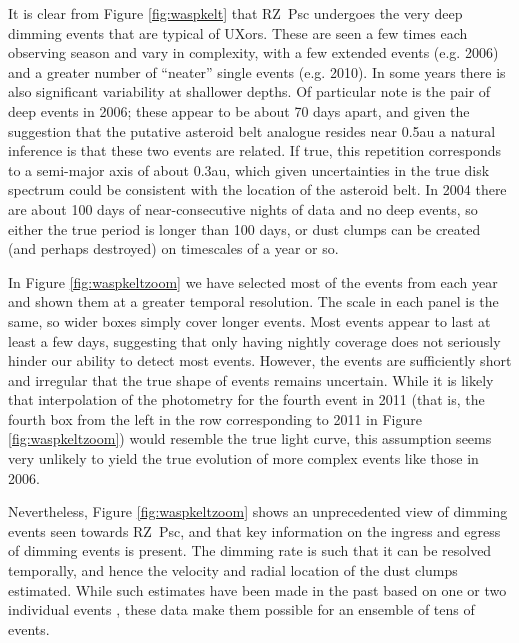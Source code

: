 \documentclass[]{rsos}
\begin{document}
It is clear from Figure \ref{fig:waspkelt} that RZ~Psc undergoes the very deep dimming
events that are typical of UXors. These are seen a few times each observing season and
vary in complexity, with a few extended events (e.g. 2006) and a greater number of
``neater'' single events (e.g. 2010). In some years there is also significant variability
at shallower depths. Of particular note is the pair of deep events in 2006; these appear
to be about 70 days apart, and given the suggestion that the putative asteroid belt
analogue resides near 0.5au a natural inference is that these two events are related. If
true, this repetition corresponds to a semi-major axis of about 0.3au, which given
uncertainties in the true disk spectrum could be consistent with the location of the
asteroid belt. In 2004 there are about 100 days of near-consecutive nights of data and no
deep events, so either the true period is longer than 100 days, or dust clumps can be
created (and perhaps destroyed) on timescales of a year or so.

In Figure \ref{fig:waspkeltzoom} we have selected most of the events from each year and
shown them at a greater temporal resolution. The scale in each panel is the same, so
wider boxes simply cover longer events. Most events appear to last at least a few days,
suggesting that only having nightly coverage does not seriously hinder our ability to
detect most events. However, the events are sufficiently short and irregular that the
true shape of events remains uncertain. While it is likely that interpolation of the
photometry for the fourth event in 2011 (that is, the fourth box from the left in the row
corresponding to 2011 in Figure \ref{fig:waspkeltzoom}) would resemble the true light
curve, this assumption seems very unlikely to yield the true evolution of more complex
events like those in 2006.

Nevertheless, Figure \ref{fig:waspkeltzoom} shows an unprecedented view of dimming events
seen towards RZ~Psc, and that key information on the ingress and egress of dimming events
is present. The dimming rate is such that it can be resolved temporally, and hence the
velocity and radial location of the dust clumps estimated. While such estimates have been
made in the past based on one or two individual events \cite{1985PZ.....22..181Z}, these
data make them possible for an ensemble of tens of events.
\end{document}
